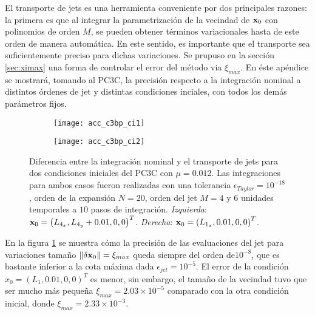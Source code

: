 El transporte de jets es una herramienta conveniente por dos principales razones: la primera es que al integrar la parametrización de la vecindad de $\mathbf{x}_0$ con polinomios de orden $M$, se pueden obtener términos variacionales hasta de este orden de manera automática. En este sentido, es importante que el transporte sea suficientemente preciso para dichas variaciones. Se prupuso en la sección \ref{sec:ximax} una forma de controlar el error del método via $\xi_{max}$. En éste apéndice se mostrará, tomando al PC3C, la precisión respecto a la integración nominal a distintos órdenes de jet y distintas condiciones inciales, con todos los demás parámetros fijos. 

\begin{figure}[h!]
\centering
\begin{subfigure}{0.49\textwidth}
	\centering
	\texttt{[image: acc\_c3bp\_ci1]}
\end{subfigure}
%
\begin{subfigure}{0.49\textwidth}
	\centering
	\texttt{[image: acc\_c3bp\_ci2]}
\end{subfigure}
\caption{Diferencia entre la integración nominal y el transporte de jets para dos condiciones iniciales del PC3C con $\mu = 0.012$. Las integraciones para ambos casos fueron realizadas con una tolerancia $\epsilon_{Taylor} = 10^{-18}$, orden de la expansión $N=20$, orden del jet $M=4$ y $6$ unidades temporales a $10$ pasos de integración. \textit{Izquierda}: $\mathbf{x}_0 =\left(L_{4_x}, L_{4_y} + 0.01, 0, 0 \right)^T$. \textit{Derecha}: $\mathbf{x}_0 = \left(L_{1_x}, 0.01, 0, 0 \right)^T$.}
\label{fig:acc_ci}
\end{figure}

En la figura \ref{fig:acc_ci} se muestra cómo la precisión de las evaluaciones del jet para variaciones tamaño $\left\lVert\delta \mathbf{x}_0\right\rVert = \xi_{max}$ queda siempre del orden de$10^{-8}$, que es bastante inferior a la cota máxima dada $\epsilon_{jet} = 10^{-5}$. El error de la condición $x_0 = (L_{1}, 0.01, 0,0)^T$ es menor, sin embargo, el tamaño de la vecindad tuvo que ser mucho más pequeña $\xi_{max} = 2.03 \times 10^{-5}$ comparado con la otra condición inicial, donde $\xi_{max} = 2.33 \times 10^{-3}$. 

